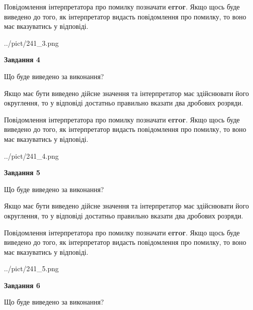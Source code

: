 \documentclass[12pt, ukrainian]{article}
\begin{document}
{\begin {Large}
Повідомлення інтерпретатора про помилку позначати \textbf{error}.
Якщо щось буде виведено до того, як інтерпретатор видасть повідомлення про помилку, 
то воно має вказуватись у відповіді. \par

\begin{center}
	{../pict/241_3.png}
\end{center}
\newpage

{\begin {center}\textbf{Завдання 4}\end {center}}\par
Що буде виведено за виконання? \par

Якщо має бути виведено дійсне значення та інтерпретатор має здійснювати його округлення, 
то у відповіді достатньо правильно вказати два дробових розряди.

Повідомлення інтерпретатора про помилку позначати \textbf{error}.
Якщо щось буде виведено до того, як інтерпретатор видасть повідомлення про помилку, 
то воно має вказуватись у відповіді. \par

\begin{center}
	{../pict/241_4.png}
\end{center}
\newpage

{\begin {center}\textbf{Завдання 5}\end {center}}\par
Що буде виведено за виконання? \par

Якщо має бути виведено дійсне значення та інтерпретатор має здійснювати його округлення, 
то у відповіді достатньо правильно вказати два дробових розряди.

Повідомлення інтерпретатора про помилку позначати \textbf{error}.
Якщо щось буде виведено до того, як інтерпретатор видасть повідомлення про помилку, 
то воно має вказуватись у відповіді. \par

\begin{center}
	{../pict/241_5.png}
\end{center}
\newpage

{\begin {center}\textbf{Завдання 6}\end {center}}\par
Що буде виведено за виконання? \par


\end{Large}}
\end{document}
